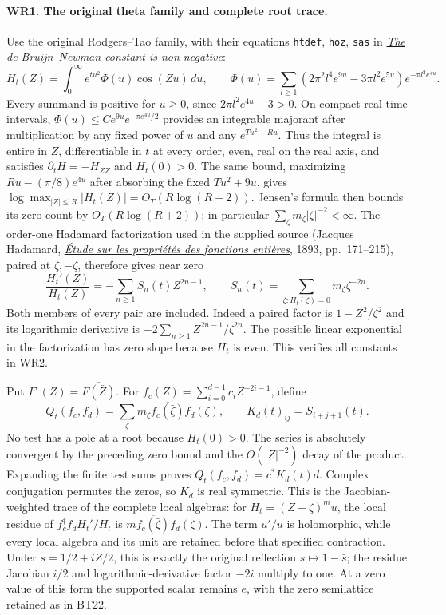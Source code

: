 \documentclass[11pt,a4paper]{article}
\theoremstyle{definition}\newtheorem{definition}[theorem]{Definition}
\begin{document}
\paragraph{WR1. The original theta family and complete root trace.}
Use the original Rodgers--Tao family, with their equations
\texttt{htdef}, \texttt{hoz}, \texttt{sas} in
\href{https://arxiv.org/abs/1801.05914v5}{\emph{The de Bruijn--Newman
constant is non-negative}}:
\[
 H_t(Z)=\int_0^\infty e^{tu^2}\Phi(u)\cos(Zu)\,du,\qquad
 \Phi(u)=\sum_{l\ge1}(2\pi^2l^4e^{9u}-3\pi l^2e^{5u})
                         e^{-\pi l^2e^{4u}}.
 \tag{WR1}
\]
Every summand is positive for $u\ge0$, since
$2\pi l^2e^{4u}-3>0$. On compact real time intervals,
$\Phi(u)\le C e^{9u}e^{-\pi e^{4u}/2}$ provides an integrable
majorant after multiplication by any fixed power of $u$ and any
$e^{Tu^2+R u}$. Thus the integral is entire in $Z$, differentiable
in $t$ at every order, even, real on the real axis, and satisfies
$\partial_tH=-H_{ZZ}$ and $H_t(0)>0$.
The same bound, maximizing $Ru-(\pi/8)e^{4u}$ after absorbing
the fixed $Tu^2+9u$, gives
$\log\max_{|Z|\le R}|H_t(Z)|=O_T(R\log(R+2))$.
Jensen's formula then bounds its zero count by $O_T(R\log(R+2))$;
in particular $\sum_\zeta m_\zeta|\zeta|^{-2}<\infty$.
The order-one Hadamard factorization used in the supplied source
(Jacques Hadamard,
\href{https://www.numdam.org/item/JMPA_1893_4_9__171_0/}
{\emph{\'Etude sur les propri\'et\'es des fonctions enti\`eres}},
1893, pp.~171--215),
paired at $\zeta,-\zeta$, therefore gives near zero
\[
 \frac{H_t'(Z)}{H_t(Z)}=-\sum_{n\ge1}S_n(t)Z^{2n-1},\qquad
 S_n(t)=\sum_{\zeta:H_t(\zeta)=0}m_\zeta\zeta^{-2n}.
 \tag{WR2}
\]
Both members of every pair are included. Indeed a paired factor is
$1-Z^2/\zeta^2$ and its logarithmic derivative is
$-2\sum_{n\ge1}Z^{2n-1}/\zeta^{2n}$. The possible linear
exponential in the factorization has zero slope because $H_t$ is
even. This verifies all constants in WR2.

Put $F^\dagger(Z)=\overline{F(\bar Z)}$. For
$f_c(Z)=\sum_{i=0}^{d-1}c_iZ^{-2i-1}$, define
\[
 Q_t(f_c,f_d)=\sum_\zeta m_\zeta
                \overline{f_c(\bar\zeta)}f_d(\zeta),\qquad
 K_d(t)_{ij}=S_{i+j+1}(t).
 \tag{WR3}
\]
No test has a pole at a root because $H_t(0)>0$.
The series is absolutely convergent by the preceding zero bound
and the $O(|Z|^{-2})$ decay of the product. Expanding the finite
test sums proves $Q_t(f_c,f_d)=c^*K_d(t)d$. Complex conjugation
permutes the zeros, so $K_d$ is real symmetric. This is the
Jacobian-weighted trace of the complete local algebras: for
$H_t=(Z-\zeta)^m u$, the local residue of
$f_c^\dagger f_d H_t'/H_t$ is
$m\overline{f_c(\bar\zeta)}f_d(\zeta)$. The term $u'/u$ is
holomorphic, while every local algebra and its unit are retained
before that specified contraction. Under $s=1/2+iZ/2$, this is
exactly the original reflection $s\mapsto1-\bar s$; the residue
Jacobian $i/2$ and logarithmic-derivative factor $-2i$ multiply to
one. At a zero value of this form the supported scalar remains
$e$, with the zero semilattice retained as in BT22.
\end{document}
